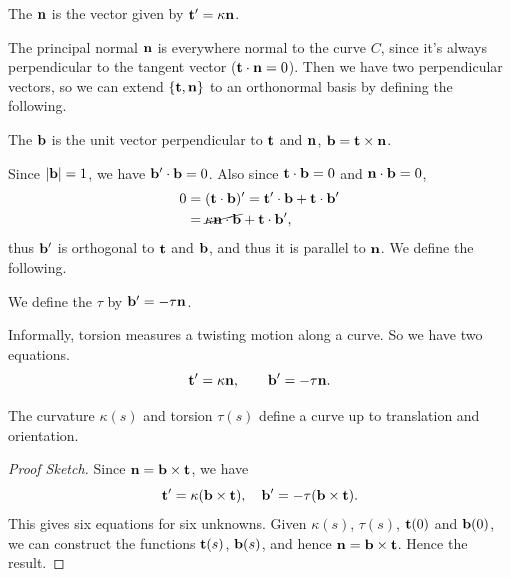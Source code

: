 \documentclass[a4paper]{scrartcl}
\begin{document}
\begin{definition}
	The  $\mathbf{n}$ is the vector given by $\mathbf{t}' = \kappa \mathbf{n}$.
\end{definition}

The principal normal $\mathbf{n}$ is everywhere normal to the curve $C$, since it's always perpendicular to the tangent vector ($\mathbf{t} \cdot \mathbf{n} = 0$). Then we have two perpendicular vectors, so we can extend $\{\mathbf{t}, \mathbf{n}\}$ to an orthonormal basis by defining the following.

\begin{definition}[Binormal]
	The  $\mathbf{b}$ is the unit vector perpendicular to $\mathbf{t}$ and $\mathbf{n}$, $\mathbf{b} = \mathbf{t} \times \mathbf{n}$. 
\end{definition}

Since $|\mathbf{b}| = 1$, we have $\mathbf{b}' \cdot \mathbf{b} = 0$. Also since $\mathbf{t} \cdot \mathbf{b} = 0$ and $\mathbf{n} \cdot \mathbf{b} = 0$,
\begin{align*}
	0 &= (\mathbf{t} \cdot \mathbf{b})' = \mathbf{t}' \cdot \mathbf{b} + \mathbf{t} \cdot \mathbf{b}'  \\
	&= \cancel{\kappa \mathbf{n} \cdot \mathbf{b}} + \mathbf{t} \cdot \mathbf{b}',
\end{align*}
thus $\mathbf{b}'$ is orthogonal to $\mathbf{t}$ and $\mathbf{b}$, and thus it is parallel to $\mathbf{n}$. We define the following.

\begin{definition}[Torsion]
	We define the  $\tau$ by $\mathbf{b}' = - \tau \mathbf{n}$.
\end{definition}

Informally, torsion measures a twisting motion along a curve.
So we have two equations.
$$
\mathbf{t}' = \kappa \mathbf{n}, \quad \quad \mathbf{b}' = - \tau \mathbf{n}.
$$

\begin{proposition}
	The curvature $\kappa(s)$ and torsion $\tau(s)$ define a curve up to translation and orientation.
\end{proposition}
\begin{proof}[Proof Sketch]
	Since $\mathbf{n} = \mathbf{b} \times \mathbf{t}$, we have
	$$
	\mathbf{t}' = \kappa (\mathbf{b} \times \mathbf{t}), \quad \mathbf{b}' = - \tau (\mathbf{b} \times \mathbf{t}).
	$$
	This gives six equations for six unknowns. Given $\kappa(s)$, $\tau(s)$, $\mathbf{t}(0)$ and $\mathbf{b}(0)$, we can construct the functions $\mathbf{t}(s)$, $\mathbf{b}(s)$, and hence $\mathbf{n} = \mathbf{b} \times \mathbf{t}$. Hence the result.
\end{proof}
\end{document}
